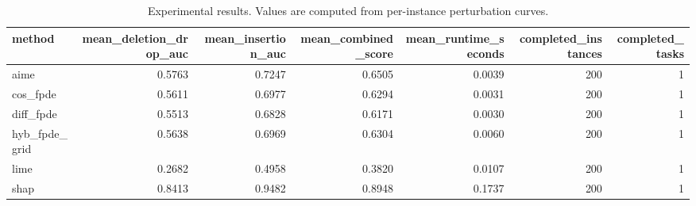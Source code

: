 \begin{table}[t]
\caption{Experimental results. Values are computed from per-instance perturbation curves.}
\label{tab:main_results_computed}
\centering
\begin{tabular}{lrrrrrr}
\toprule
method & mean\_deletion\_drop\_auc & mean\_insertion\_auc & mean\_combined\_score & mean\_runtime\_seconds & completed\_instances & completed\_tasks \\
\midrule
aime & 0.5763 & 0.7247 & 0.6505 & 0.0039 & 200 & 1 \\
cos\_fpde & 0.5611 & 0.6977 & 0.6294 & 0.0031 & 200 & 1 \\
diff\_fpde & 0.5513 & 0.6828 & 0.6171 & 0.0030 & 200 & 1 \\
hyb\_fpde\_grid & 0.5638 & 0.6969 & 0.6304 & 0.0060 & 200 & 1 \\
lime & 0.2682 & 0.4958 & 0.3820 & 0.0107 & 200 & 1 \\
shap & 0.8413 & 0.9482 & 0.8948 & 0.1737 & 200 & 1 \\
\bottomrule
\end{tabular}

\end{table}

